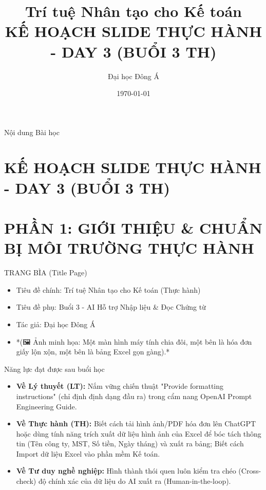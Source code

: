 \documentclass[aspectratio=169]{beamer}
\title[Trí tuệ Nhân tạo cho Kế toán]{Trí tuệ Nhân tạo cho Kế toán \\ \vspace{0.3cm} \Large KẾ HOẠCH SLIDE THỰC HÀNH - DAY 3 (BUỔI 3 TH)}
\author{Đại học Đông Á}
\date{\today}
\begin{document}
\begin{frame}
    \titlepage
\end{frame}

\begin{frame}{Nội dung Bài học}
    \tableofcontents
\end{frame}


\section{KẾ HOẠCH SLIDE THỰC HÀNH - DAY 3 (BUỔI 3 TH)}


\section{PHẦN 1: GIỚI THIỆU \& CHUẨN BỊ MÔI TRƯỜNG THỰC HÀNH}


\begin{frame}{TRANG BÌA (Title Page)}
    \begin{itemize}
        \item Tiêu đề chính: Trí tuệ Nhân tạo cho Kế toán (Thực hành)
        \item Tiêu đề phụ: Buổi 3 - AI Hỗ trợ Nhập liệu \& Đọc Chứng từ
        \item Tác giả: Đại học Đông Á
        \item *(🖼️ Ảnh minh họa: Một màn hình máy tính chia đôi, một bên là hóa đơn giấy lộn xộn, một bên là bảng Excel gọn gàng).*
    \end{itemize}
\end{frame}


\begin{frame}{Năng lực đạt được sau buổi học}
    \begin{itemize}
        \item \textbf{Về Lý thuyết (LT):} Nắm vững chiến thuật "Provide formatting instructions" (chỉ định định dạng đầu ra) trong cẩm nang OpenAI Prompt Engineering Guide.
        \item \textbf{Về Thực hành (TH):} Biết cách tải hình ảnh/PDF hóa đơn lên ChatGPT hoặc dùng tính năng trích xuất dữ liệu hình ảnh của Excel để bóc tách thông tin (Tên công ty, MST, Số tiền, Ngày tháng) và xuất ra bảng; Biết cách Import dữ liệu Excel vào phần mềm Kế toán.
        \item \textbf{Về Tư duy nghề nghiệp:} Hình thành thói quen luôn kiểm tra chéo (Cross-check) độ chính xác của dữ liệu do AI xuất ra (Human-in-the-loop).
    \end{itemize}
\end{frame}
\end{document}
